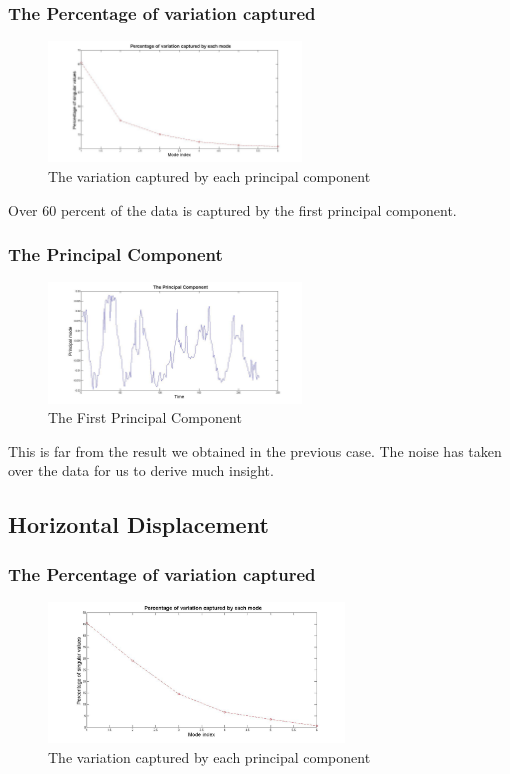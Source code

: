 \documentclass[a4paper]{article}
\begin{document}
\subsubsection{The Percentage of variation captured}
\begin{figure}[h!] 
	\centering
	\includegraphics[width=0.6\textwidth]{percent2.jpg}
	\caption{The variation captured by each principal component}
\end{figure}

Over 60 percent of the data is captured by the first principal component. 

\subsubsection{The Principal Component}
\begin{figure}[H] 
	\centering
	\includegraphics[width=0.6\textwidth]{PC2.jpg}
	
	\caption{The First Principal Component}	
\end{figure}
This is far from the result we obtained in the previous case. The noise has taken over the data for us to derive much insight.

\subsection{Horizontal Displacement}






\subsubsection{The Percentage of variation captured}
\begin{figure}[h!] 
	\centering
	\includegraphics[width=0.7\textwidth]{percent3.jpg}
	\caption{The variation captured by each principal component}
\end{figure}
\end{document}
